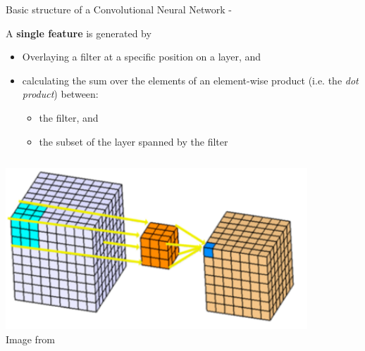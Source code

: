 \begin{frame}[t,allowframebreaks]{Basic structure of a Convolutional Neural Network -}
    \framebreak

    A {\bf single feature} is generated by 
    \begin{itemize}
      \item 
      Overlaying a \gls{filter} at a specific position on a layer, and
      \item 
      calculating the sum over the elements of an element-wise product 
      (i.e. the {\em dot product}) between:
      \begin{itemize}
        \item the filter, and
        \item the subset of the layer spanned by the filter
      \end{itemize}
    \end{itemize}

    \begin{columns}
        \begin{column}{0.60\textwidth}
            \begin{center}
                \includegraphics[width=0.97\textwidth]
                  {./images/cnn/convolution/bansal19_convolution_illustration.png}\\
                {\scriptsize 
                  \color{col:attribution} 
                  Image from \cite{Kaggle:3DConvolutions}}\\    
            \end{center}      
        \end{column}
        \begin{column}{0.40\textwidth}
            \vspace{0.0cm}
        \end{column}
    \end{columns}

    \framebreak


\end{frame}
